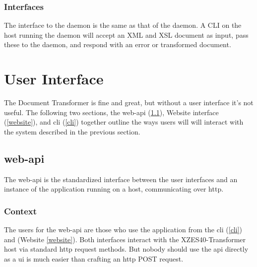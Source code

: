 \subsubsection{Interfaces}

The interface to the daemon is the same as that of the daemon.
A CLI on the host running the daemon will accept an XML and XSL document as input, pass these to the daemon, and respond with an error or transformed document.

\section{User Interface}
\label{user-interface}

The Document Transformer is fine and great, but without a user interface it's not useful.
The following two sections, the \gls{web-api} (\ref{web-api}), Website interface (\ref{website}), and \gls{cli} (\ref{cli}) together outline the ways users will will interact with the system described in the previous section.

\subsection{\gls{web-api}}
\label{web-api}

The \gls{web-api} is the standardized interface between the user interfaces and an instance of the application running on a host, communicating over \gls{http}.

\subsubsection{Context}

The users for the \gls{web-api} are those who use the application from the \gls{cli} (\ref{cli}) and (Website \ref{website}).
Both interfaces interact with the XZES40-Transformer host via standard \gls{http} request methods.
But nobody should use the \gls{api} directly as a \gls{ui} is much easier than crafting an \gls{http} POST request.

